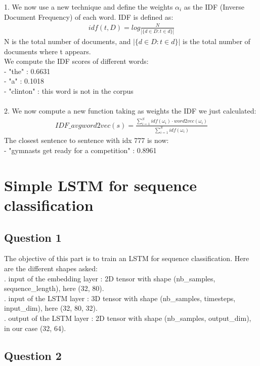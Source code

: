 \documentclass[11pt, oneside]{article}   	%
\begin{document}
1. We now use a new technique and define the weights $\alpha_{i}$ as the IDF (Inverse Document Frequency) of each word. IDF is defined as:\\
	\[\begin{split}
		idf(t,D) = log\frac{N}{|\{d \in D : t \in d\}|}
	\end{split}\]
N is the total number of documents, and $|\{d \in D : t \in d\}|$ is the total number of documents where t appears.\\
We compute the IDF scores of different words:\\
\indent - "the" : 0.6631\\
\indent - "a" : 0.1018\\
\indent - "clinton" : this word is not in the corpus\\
\\
2. We now compute a new function taking as weights the IDF we just calculated:\\
	\[\begin{split}
		IDF\_avgword2vec(s) = \frac{\sum_{i=1}^{S}idf(\omega_{i})\cdot word2vec(\omega_{i})}{\sum_{i=1}^{S}idf(\omega_{i})}
	\end{split}\]
The closest sentence to sentence with idx 777 is now:\\
\indent - "gymnasts get ready for a competition" : 0.8961

\newpage
\section{Simple LSTM for sequence classification}
\vspace{4pt}

\subsection{Question 1}
The objective of this part is to train an LSTM for sequence classification. Here are the different shapes asked:\\
. input of the embedding layer : 2D tensor with shape (nb\_samples, sequence\_length), here (32, 80).\\
. input of the LSTM layer : 3D tensor with shape (nb\_samples, timesteps, input\_dim), here (32, 80, 32).\\
. output of the LSTM layer : 2D tensor with shape (nb\_samples, output\_dim), in our case (32, 64).

\subsection{Question 2}
\end{document}
